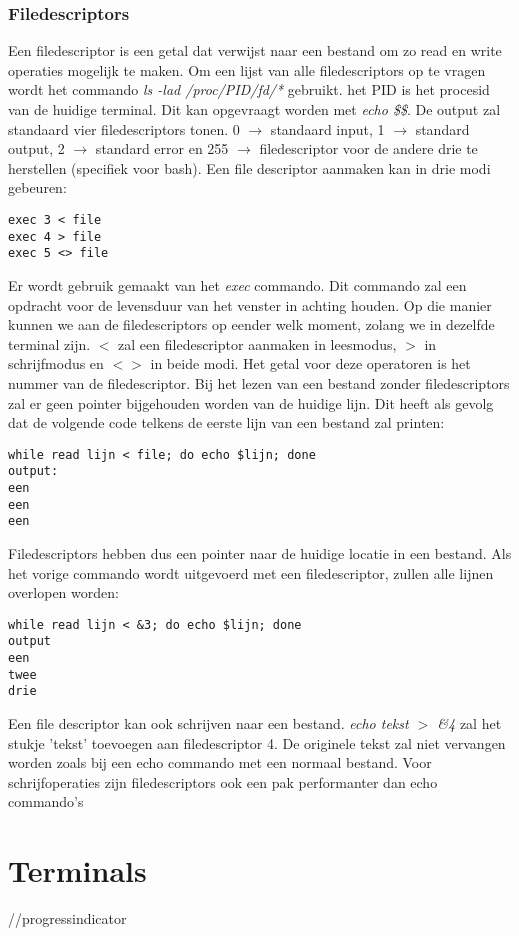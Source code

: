 \documentclass{report}
\begin{document}
\subsubsection{Filedescriptors}
Een filedescriptor is een getal dat verwijst naar een bestand om zo read en write operaties mogelijk te maken. Om een lijst van alle filedescriptors op te vragen wordt het commando \textit{ls -lad /proc/PID/fd/*} gebruikt. het PID is het procesid van de huidige terminal. Dit kan opgevraagt worden met \textit{echo \$\$}. De output zal standaard vier filedescriptors tonen. 0 $\rightarrow$ standaard input, 1 $\rightarrow$ standard output, 2 $\rightarrow$ standard error en 255 $\rightarrow$ filedescriptor voor de andere drie te herstellen (specifiek voor bash). Een file descriptor aanmaken kan in drie modi gebeuren:
\begin{lstlisting}
exec 3 < file
exec 4 > file
exec 5 <> file
\end{lstlisting}
Er wordt gebruik gemaakt van het \textit{exec} commando. Dit commando zal een opdracht voor de levensduur van het venster in achting houden. Op die manier kunnen we aan de filedescriptors op eender welk moment, zolang we in dezelfde terminal zijn. $<$ zal een filedescriptor aanmaken in leesmodus, $>$ in schrijfmodus en $<>$ in beide modi. Het getal voor deze operatoren is het nummer van de filedescriptor.
\newline
Bij het lezen van een bestand zonder filedescriptors zal er geen pointer bijgehouden worden van de huidige lijn. Dit heeft als gevolg dat de volgende code telkens de eerste lijn van een bestand zal printen:
\begin{lstlisting}
while read lijn < file; do echo $lijn; done
output:
een
een
een
\end{lstlisting}
Filedescriptors hebben dus een pointer naar de huidige locatie in een bestand. Als het vorige commando wordt uitgevoerd met een filedescriptor, zullen alle lijnen overlopen worden:
\begin{lstlisting}
while read lijn < &3; do echo $lijn; done
output
een
twee
drie
\end{lstlisting}
Een file descriptor kan ook schrijven naar een bestand. \textit{echo tekst $>$ \&4} zal het stukje 'tekst' toevoegen aan filedescriptor 4. De originele tekst zal niet vervangen worden zoals bij een echo commando met een normaal bestand. Voor schrijfoperaties zijn filedescriptors ook een pak performanter dan echo commando's
\section{Terminals}
//progressindicator 
\end{document}
